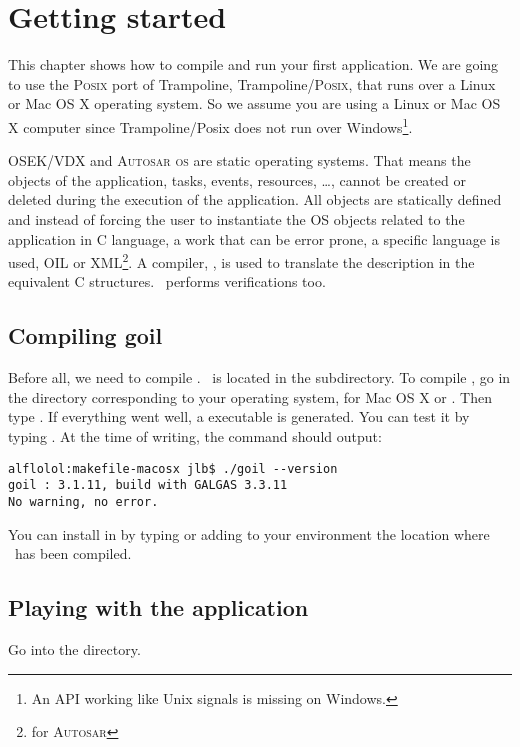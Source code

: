 
\chapter{Getting started}

This chapter shows how to compile and run your first application. We are going to use the \textsc{Posix} port of Trampoline, Trampoline/\textsc{Posix}, that runs over a Linux or Mac OS X operating system. So we assume you are using a Linux or Mac OS X computer since Trampoline/Posix does not run over Windows\footnote{An API working like Unix signals is missing on Windows.}.

OSEK/VDX and \textsc{Autosar os} are static operating systems. That means the objects of the application, tasks, events, resources, \ldots, cannot be created or deleted during the execution of the application. All objects are statically defined and instead of forcing the user to instantiate the OS objects related to the application in C language, a work that can be error prone, a specific language is used, OIL or XML\footnote{for \textsc{Autosar}}. A compiler, \goil, is used to translate the description in the equivalent C structures. \goil\ performs verifications too.

\section{Compiling goil}

Before all, we need to compile . \goil\ is located in the  subdirectory. To compile \goil, go in the directory corresponding to your operating system,  for Mac OS X or . Then type . If everything went well, a  executable is generated. You can test it by typing . At the time of writing, the command should output:

\begin{verbatim}
alflolol:makefile-macosx jlb$ ./goil --version
goil : 3.1.11, build with GALGAS 3.3.11
No warning, no error.
\end{verbatim}

You can install  in  by typing  or adding to your  environment the location where \goil\ has been compiled.

\section{Playing with the  application}

Go into the  directory.